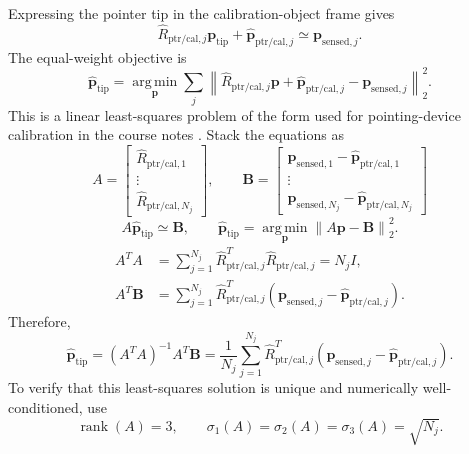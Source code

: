 \documentclass[11pt]{article}
\newcommand{\vct}[1]{\bm{#1}}
\newcommand{\rank}{\operatorname{rank}}
\newcommand{\norm}[1]{\left\|#1\right\|_2}
\begin{document}
Expressing the pointer tip in the calibration-object frame gives
\begin{equation}
\widehat R_{\mathrm{ptr/cal},j}\vct{p}_{\mathrm{tip}}+\widehat{\vct{p}}_{\mathrm{ptr/cal},j}
\simeq\vct{p}_{\mathrm{sensed},j}.
\end{equation}
The equal-weight objective is
\begin{equation}
\widehat{\vct{p}}_{\mathrm{tip}}
=\underset{\vct{p}}{\operatorname{arg\,min}}
\sum_j\norm{\widehat R_{\mathrm{ptr/cal},j}\vct{p}
+\widehat{\vct{p}}_{\mathrm{ptr/cal},j}
-\vct{p}_{\mathrm{sensed},j}}^2.
\end{equation}
This is a linear least-squares problem of the form used for pointing-device
calibration in the course notes \cite{calibration,leastsquares}.
Stack the equations as
\begin{equation}
A=\begin{bmatrix}\widehat R_{\mathrm{ptr/cal},1}\\\vdots\\\widehat R_{\mathrm{ptr/cal},N_j}\end{bmatrix},\qquad
\vct{B}=\begin{bmatrix}\vct{p}_{\mathrm{sensed},1}-\widehat{\vct{p}}_{\mathrm{ptr/cal},1}\\\vdots\\
\vct{p}_{\mathrm{sensed},N_j}-\widehat{\vct{p}}_{\mathrm{ptr/cal},N_j}\end{bmatrix}
\end{equation}
\begin{equation}
A\widehat{\vct{p}}_{\mathrm{tip}}\simeq\vct{B},\qquad
\widehat{\vct{p}}_{\mathrm{tip}}
=\underset{\vct{p}}{\operatorname{arg\,min}}
\norm{A\vct{p}-\vct{B}}^2.
\end{equation}
\begin{align}
A^TA
&=\sum_{j=1}^{N_j}
\widehat R_{\mathrm{ptr/cal},j}^T
\widehat R_{\mathrm{ptr/cal},j}
=N_jI,\\
A^T\vct{B}
&=\sum_{j=1}^{N_j}
\widehat R_{\mathrm{ptr/cal},j}^T
(\vct{p}_{\mathrm{sensed},j}-\widehat{\vct{p}}_{\mathrm{ptr/cal},j}).
\end{align}
Therefore,
\begin{equation}
\boxed{
\widehat{\vct{p}}_{\mathrm{tip}}
=(A^TA)^{-1}A^T\vct{B}
=\frac1{N_j}\sum_{j=1}^{N_j}
\widehat R_{\mathrm{ptr/cal},j}^T
(\vct{p}_{\mathrm{sensed},j}-\widehat{\vct{p}}_{\mathrm{ptr/cal},j})
}.
\end{equation}
To verify that this least-squares solution is unique and numerically
well-conditioned, use
\begin{equation}
\rank(A)=3,\qquad
\sigma_1(A)=\sigma_2(A)=\sigma_3(A)=\sqrt{N_j}.
\end{equation}
\end{document}

